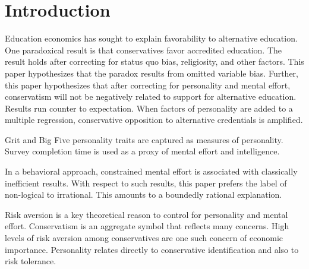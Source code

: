 \documentclass[review]{elsarticle}
\begin{document}
\pagebreak
\linenumbers

\section{Introduction}

Education economics has sought to explain favorability to alternative education.
One paradoxical result is that conservatives favor accredited education\cite{vandivier2020preliminary}.
The result holds after correcting for status quo bias, religiosity, and other factors.
This paper hypothesizes that the paradox results from omitted variable bias.
Further, this paper hypothesizes that after correcting for personality and mental effort,
conservatism will not be negatively related to support for alternative education.
Results run counter to expectation.
When factors of personality are added to a multiple regression,
conservative opposition to alternative credentials is amplified.

Grit and Big Five personality traits are captured as measures of personality.
Survey completion time is used as a proxy of mental effort and intelligence.

In a behavioral approach, constrained mental effort is associated with classically inefficient results.
With respect to such results, this paper prefers the label of non-logical to irrational.
This amounts to a boundedly rational explanation\cite{candela2016vilfredo}.

Risk aversion is a key theoretical reason to control for personality and mental effort.
Conservatism is an aggregate symbol that reflects many concerns\cite{hill1997liberal}.
High levels of risk aversion among conservatives are one such concern of economic importance\cite{perhac1996does}.
Personality relates directly to conservative identification\cite{chirumbolo2010personality} and also to risk tolerance.
\end{document}
